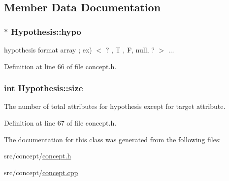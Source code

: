 \subsection{Member Data Documentation}
\hypertarget{class_hypothesis_a01481da71fa839150188db4720b02439}{
\subsubsection[{hypo}]{$\ast$ Hypothesis\-::hypo\hspace{0.3cm}{\ttfamily [private]}}}\label{class_hypothesis_a01481da71fa839150188db4720b02439}


hypothesis format array ; ex) $<$ ? , T , F, null, ? $>$ ... 



Definition at line 66 of file concept.\-h.

\hypertarget{class_hypothesis_a2fda5511fef4765414c3229ea6780e1e}{
\subsubsection[{size}]{\setlength{\rightskip}{0pt plus 5cm}int Hypothesis\-::size\hspace{0.3cm}{\ttfamily [private]}}}\label{class_hypothesis_a2fda5511fef4765414c3229ea6780e1e}


The number of total attributes for hypothesis except for target attribute. 



Definition at line 67 of file concept.\-h.



The documentation for this class was generated from the following files\-:\begin{DoxyCompactItemize}
\item 
src/concept/\hyperlink{concept_8h}{concept.\-h}\item 
src/concept/\hyperlink{concept_8cpp}{concept.\-cpp}\end{DoxyCompactItemize}
